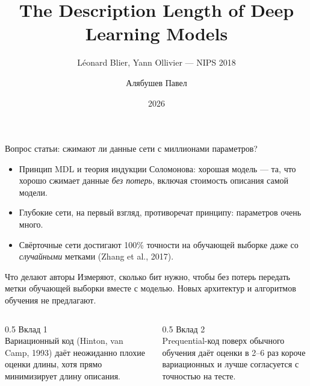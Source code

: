 \documentclass[aspectratio=169,10pt]{beamer}
\title[Description Length of Deep Learning Models]{The Description Length of Deep Learning Models}
\subtitle{L\'eonard Blier, Yann Ollivier --- NIPS 2018}
\author{Алябушев Павел}
\institute{Bayesian multimodeling, МФТИ}
\date{2026}
\begin{document}
\begin{frame}
  \titlepage
\end{frame}

\begin{frame}{Вопрос статьи: сжимают ли данные сети с миллионами параметров?}
  \begin{itemize}
    \item Принцип MDL и теория индукции Соломонова: хорошая модель --- та, что хорошо сжимает данные \emph{без потерь}, \alert{включая стоимость описания самой модели}.
    \item Глубокие сети, на первый взгляд, противоречат принципу: параметров очень много.
    \item Свёрточные сети достигают 100\% точности на обучающей выборке даже со \emph{случайными} метками (Zhang et al., 2017).
  \end{itemize}
  \begin{block}{Что делают авторы}
    Измеряют, сколько бит нужно, чтобы без потерь передать метки обучающей выборки вместе с моделью. Новых архитектур и алгоритмов обучения не предлагают.
  \end{block}
  \begin{columns}[T]
    \begin{column}{0.5\textwidth}
      \textcolor{structure}{Вклад 1}\\
      Вариационный код (Hinton, van Camp, 1993) даёт неожиданно \alert{плохие} оценки длины, хотя прямо минимизирует длину описания.
    \end{column}
    \begin{column}{0.5\textwidth}
      \textcolor{structure}{Вклад 2}\\
      Prequential-код поверх обычного обучения даёт оценки в 2--6 раз короче вариационных и лучше согласуется с точностью на тесте.
    \end{column}
  \end{columns}
\end{frame}
\end{document}
